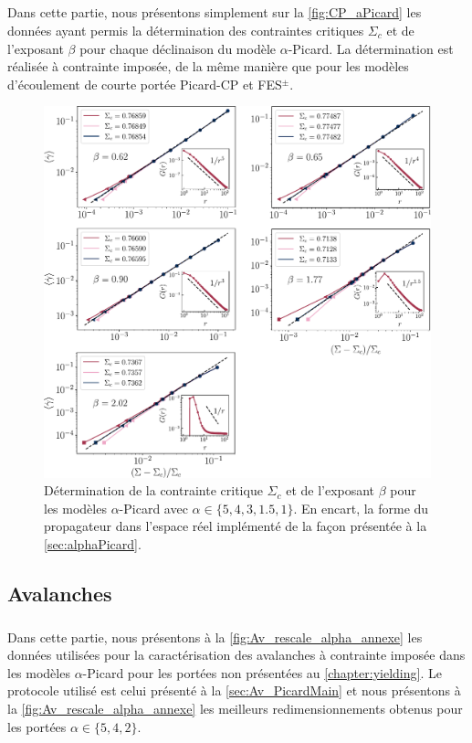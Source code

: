 \label{sec:CP_aPicard}

\subparagraph{}Dans cette partie, nous présentons simplement sur la \autoref{fig:CP_aPicard} les données ayant permis la détermination des contraintes critiques $\Sigma_c$ et de l'exposant $\beta$ pour chaque déclinaison du modèle $\alpha$-Picard. La détermination est réalisée à contrainte imposée, de la même manière que pour les modèles d'écoulement de courte portée Picard-CP et FES$^\pm$.

\begin{figure}[H]
	\centering
	\includegraphics[width=\textwidth]{Chapitre6/Figures/CP_alphaPicard.pdf}

	\caption{Détermination de la contrainte critique $\Sigma_c$ et de l'exposant $\beta$ pour les modèles $\alpha$-Picard avec $\alpha \in \{ 5, 4, 3, 1.5, 1 \}$. En encart, la forme du propagateur dans l'espace réel implémenté de la façon présentée à la \autoref{sec:alphaPicard}.}
		\label{fig:CP_aPicard}
\end{figure}

\subsection{Avalanches}

\label{sec:AvAPicard}

\subparagraph{}Dans cette partie, nous présentons à la \autoref{fig:Av_rescale_alpha_annexe} les données utilisées pour la caractérisation des avalanches à contrainte imposée dans les modèles $\alpha$-Picard pour les portées non présentées au \autoref{chapter:yielding}. Le protocole utilisé est celui présenté à la \autoref{sec:Av_PicardMain} et nous présentons à la \autoref{fig:Av_rescale_alpha_annexe} les meilleurs redimensionnements obtenus pour les portées $\alpha \in \{5, 4, 2 \}$.

